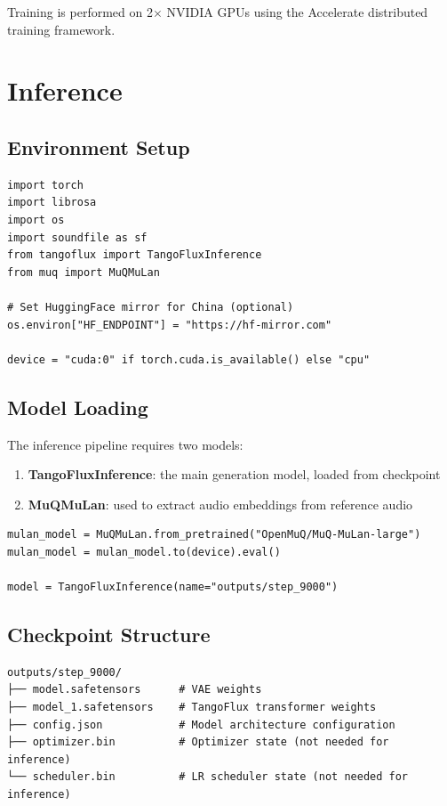 \documentclass[11pt,a4paper]{article}
\begin{document}
Training is performed on 2$\times$ NVIDIA GPUs using the Accelerate distributed training framework.

\section{Inference}

\subsection{Environment Setup}

\begin{verbatim}
import torch
import librosa
import os
import soundfile as sf
from tangoflux import TangoFluxInference
from muq import MuQMuLan

# Set HuggingFace mirror for China (optional)
os.environ["HF_ENDPOINT"] = "https://hf-mirror.com"

device = "cuda:0" if torch.cuda.is_available() else "cpu"
\end{verbatim}

\subsection{Model Loading}

The inference pipeline requires two models:
\begin{enumerate}[leftmargin=1.5em]
    \item \textbf{TangoFluxInference}: the main generation model, loaded from checkpoint
    \item \textbf{MuQMuLan}: used to extract audio embeddings from reference audio
\end{enumerate}

\begin{verbatim}
mulan_model = MuQMuLan.from_pretrained("OpenMuQ/MuQ-MuLan-large")
mulan_model = mulan_model.to(device).eval()

model = TangoFluxInference(name="outputs/step_9000")
\end{verbatim}

\subsection{Checkpoint Structure}

\begin{verbatim}
outputs/step_9000/
├── model.safetensors      # VAE weights
├── model_1.safetensors    # TangoFlux transformer weights
├── config.json            # Model architecture configuration
├── optimizer.bin          # Optimizer state (not needed for inference)
└── scheduler.bin          # LR scheduler state (not needed for inference)
\end{verbatim}
\end{document}
